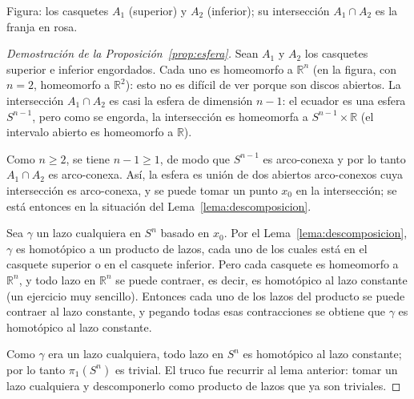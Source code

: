 \documentclass[11pt]{article}
\begin{document}
\begin{center}
\end{center}

\noindent Figura: los casquetes $A_1$ (superior) y $A_2$ (inferior); su intersección $A_1\cap A_2$ es la franja en rosa.

\begin{proof}[Demostración de la Proposición~\ref{prop:esfera}]
Sean $A_1$ y $A_2$ los casquetes superior e inferior engordados. Cada uno es homeomorfo a $\mathbb{R}^n$ (en la figura, con $n=2$, homeomorfo a $\mathbb{R}^2$): esto no es difícil de ver porque son discos abiertos. La intersección $A_1\cap A_2$ es casi la esfera de dimensión $n-1$: el ecuador es una esfera $S^{n-1}$, pero como se engorda, la intersección es homeomorfa a $S^{n-1}\times\mathbb{R}$ (el intervalo abierto es homeomorfo a $\mathbb{R}$).

Como $n\geq 2$, se tiene $n-1\geq 1$, de modo que $S^{n-1}$ es arco-conexa y por lo tanto $A_1\cap A_2$ es arco-conexa. Así, la esfera es unión de dos abiertos arco-conexos cuya intersección es arco-conexa, y se puede tomar un punto $x_0$ en la intersección; se está entonces en la situación del Lema~\ref{lema:descomposicion}.

Sea $\gamma$ un lazo cualquiera en $S^n$ basado en $x_0$. Por el Lema~\ref{lema:descomposicion}, $\gamma$ es homotópico a un producto de lazos, cada uno de los cuales está en el casquete superior o en el casquete inferior. Pero cada casquete es homeomorfo a $\mathbb{R}^n$, y todo lazo en $\mathbb{R}^n$ se puede contraer, es decir, es homotópico al lazo constante (un ejercicio muy sencillo). Entonces cada uno de los lazos del producto se puede contraer al lazo constante, y pegando todas esas contracciones se obtiene que $\gamma$ es homotópico al lazo constante.

Como $\gamma$ era un lazo cualquiera, todo lazo en $S^n$ es homotópico al lazo constante; por lo tanto $\pi_1(S^n)$ es trivial. El truco fue recurrir al lema anterior: tomar un lazo cualquiera y descomponerlo como producto de lazos que ya son triviales.
\end{proof}
\end{document}
